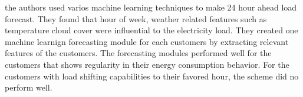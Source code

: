 \cite{parra2013initial} the authors used varios machine learning techniques to make 24 hour ahead load forecast. They found that hour of week, weather related features such as temperature cloud cover were influential to the electricity load. They created one machine learnign forecasting module for each customers by extracting relevant features of the customers. The forecasting modules performed well for the customers that shows regularity in their energy consumption behavior. For the customers with load shifting capabilities to their favored hour, the scheme did no perform well.  